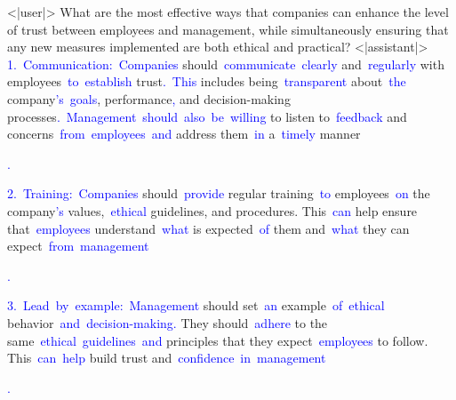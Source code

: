 \documentclass{article}
\begin{document}
\begin{tcolorbox}[colframe=black,colback=white]
<|user|>
What are the most effective ways that companies can enhance the level of trust between employees and management, while simultaneously ensuring that any new measures implemented are both ethical and practical?
<|assistant|>
\textcolor{blue}{1}\textcolor{blue}{.}\textcolor{blue}{~Communication}\textcolor{blue}{:}\textcolor{blue}{~Companies} should\textcolor{blue}{~communicate}\textcolor{blue}{~clearly} and\textcolor{blue}{~regularly} with employees\textcolor{blue}{~to}\textcolor{blue}{~establish} trust\textcolor{blue}{.}\textcolor{blue}{~This} includes being\textcolor{blue}{~transparent} about\textcolor{blue}{~the} company\textcolor{blue}{'s}\textcolor{blue}{~goals}, performance\textcolor{blue}{,} and decision-making processes\textcolor{blue}{.}\textcolor{blue}{~Management}\textcolor{blue}{~should}\textcolor{blue}{~also}\textcolor{blue}{~be}\textcolor{blue}{~willing} to listen to\textcolor{blue}{~feedback} and concerns\textcolor{blue}{~from}\textcolor{blue}{~employees}\textcolor{blue}{~and} address them\textcolor{blue}{~in} a\textcolor{blue}{~timely} manner\textcolor{blue}{.

}\textcolor{blue}{2}\textcolor{blue}{.}\textcolor{blue}{~Training}\textcolor{blue}{:}\textcolor{blue}{~Companies} should\textcolor{blue}{~provide} regular training\textcolor{blue}{~to} employees\textcolor{blue}{~on} the company\textcolor{blue}{'s} values,\textcolor{blue}{~ethical} guidelines, and procedures. This\textcolor{blue}{~can} help ensure that\textcolor{blue}{~employees} understand\textcolor{blue}{~what} is expected\textcolor{blue}{~of} them and\textcolor{blue}{~what} they can expect\textcolor{blue}{~from}\textcolor{blue}{~management}\textcolor{blue}{.

}\textcolor{blue}{3}\textcolor{blue}{.}\textcolor{blue}{~Lead}\textcolor{blue}{~by}\textcolor{blue}{~example}\textcolor{blue}{:}\textcolor{blue}{~Management} should set\textcolor{blue}{~an} example\textcolor{blue}{~of}\textcolor{blue}{~ethical} behavior\textcolor{blue}{~and}\textcolor{blue}{~decision}\textcolor{blue}{-making}\textcolor{blue}{.} They should\textcolor{blue}{~adhere} to the same\textcolor{blue}{~ethical}\textcolor{blue}{~guidelines}\textcolor{blue}{~and} principles that they expect\textcolor{blue}{~employees} to follow. This\textcolor{blue}{~can}\textcolor{blue}{~help} build trust and\textcolor{blue}{~confidence}\textcolor{blue}{~in}\textcolor{blue}{~management}\textcolor{blue}{.

}
\end{tcolorbox}
\end{document}
